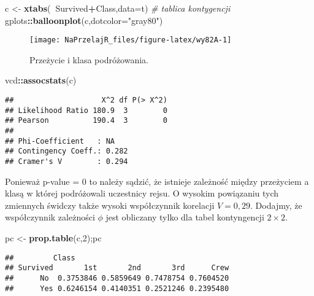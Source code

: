 \documentclass[polish,]{book}
\newenvironment{Shaded}{\begin{snugshade}}{\end{snugshade}}
\newcommand{\CommentTok}[1]{\textcolor[rgb]{0.56,0.35,0.01}{\textit{#1}}}
\newcommand{\DataTypeTok}[1]{\textcolor[rgb]{0.13,0.29,0.53}{#1}}
\newcommand{\DecValTok}[1]{\textcolor[rgb]{0.00,0.00,0.81}{#1}}
\newcommand{\KeywordTok}[1]{\textcolor[rgb]{0.13,0.29,0.53}{\textbf{#1}}}
\newcommand{\NormalTok}[1]{#1}
\newcommand{\OperatorTok}[1]{\textcolor[rgb]{0.81,0.36,0.00}{\textbf{#1}}}
\newcommand{\StringTok}[1]{\textcolor[rgb]{0.31,0.60,0.02}{#1}}
\begin{document}
\begin{Shaded}
\begin{Highlighting}[]
\NormalTok{c <-}\StringTok{ }\KeywordTok{xtabs}\NormalTok{(}\OperatorTok{~}\NormalTok{Survived}\OperatorTok{+}\NormalTok{Class,}\DataTypeTok{data=}\NormalTok{t) }\CommentTok{# tablica kontygencji}
\NormalTok{gplots}\OperatorTok{::}\KeywordTok{balloonplot}\NormalTok{(c,}\DataTypeTok{dotcolor=}\StringTok{"gray80"}\NormalTok{)}
\end{Highlighting}
\end{Shaded}

\begin{figure}[h]

{\centering \texttt{[image: NaPrzelajR\_files/figure-latex/wy82A-1]} 

}

\caption{Przeżycie i klasa podróżowania.}\label{fig:wy82A}
\end{figure}

\begin{Shaded}
\begin{Highlighting}[]
\NormalTok{vcd}\OperatorTok{::}\KeywordTok{assocstats}\NormalTok{(c)}
\end{Highlighting}
\end{Shaded}

\begin{verbatim}
##                    X^2 df P(> X^2)
## Likelihood Ratio 180.9  3        0
## Pearson          190.4  3        0
## 
## Phi-Coefficient   : NA 
## Contingency Coeff.: 0.282 
## Cramer's V        : 0.294
\end{verbatim}

Ponieważ p-value = 0 to należy sądzić, że istnieje zależność między przeżyciem a
klasą w której podróżowali uczestnicy rejsu. O wysokim powiązaniu tych zmiennych
świdczy także wysoki współczynnik korelacji \(V = 0,29\). Dodajmy, że współczynnik zależności \(\phi\) jest obliczany tylko dla tabel kontyngencji \(2\times2\).

\begin{Shaded}
\begin{Highlighting}[]
\NormalTok{pc <-}\StringTok{ }\KeywordTok{prop.table}\NormalTok{(c,}\DecValTok{2}\NormalTok{);pc}
\end{Highlighting}
\end{Shaded}

\begin{verbatim}
##         Class
## Survived       1st       2nd       3rd      Crew
##      No  0.3753846 0.5859649 0.7478754 0.7604520
##      Yes 0.6246154 0.4140351 0.2521246 0.2395480
\end{verbatim}
\end{document}

